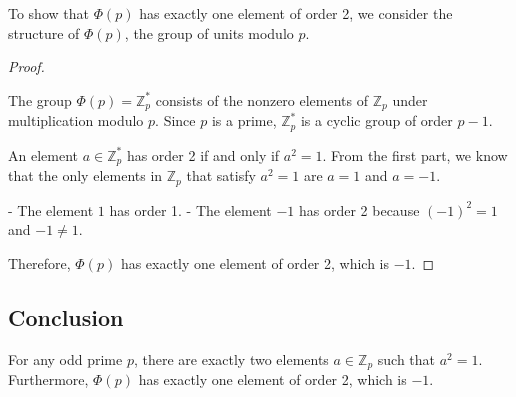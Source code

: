 \documentclass[12pt]{amsart}
\theoremstyle{definition}
\numberwithin{equation}{section}
\newcommand{\Z}{\mathbb{Z}}
\begin{document}
\begin{exercise}{7}
    To show that \(\Phi(p)\) has exactly one element of order 2, we consider the structure of \(\Phi(p)\), the group of units modulo \(p\).
    
    \begin{proof} \( \)
    
    The group \(\Phi(p) = \Z_p^*\) consists of the nonzero elements of \(\Z_p\) under multiplication modulo \(p\). Since \(p\) is a prime, \(\Z_p^*\) is a cyclic group of order \(p-1\).
    
    An element \(a \in \Z_p^*\) has order 2 if and only if \(a^2 = 1\). From the first part, we know that the only elements in \(\Z_p\) that satisfy \(a^2 = 1\) are \(a = 1\) and \(a = -1\).
    
    - The element \(1\) has order 1.
    - The element \(-1\) has order 2 because \((-1)^2 = 1\) and \(-1 \neq 1\).
    
    Therefore, \(\Phi(p)\) has exactly one element of order 2, which is \(-1\).
    
    \end{proof}
    
    \subsection*{Conclusion}
    
    For any odd prime \(p\), there are exactly two elements \(a \in \Z_p\) such that \(a^2 = 1\). Furthermore, \(\Phi(p)\) has exactly one element of order 2, which is \(-1\).
    
\end{exercise}
\newpage
\end{document}
